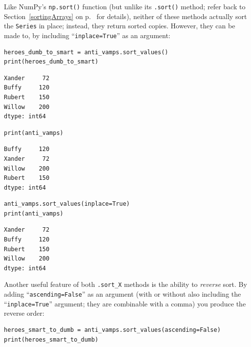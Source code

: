 Like NumPy's \texttt{np.sort()} function (but unlike its \texttt{.sort()}
method; refer back to Section~\ref{sortingArrays} on p.~\pageref{sortingArrays}
for details), neither of these methods actually sort the \texttt{Series} in
place; instead, they return sorted copies. However, they can be made to, by
including ``\texttt{inplace=True}'' as an argument:

\begin{Verbatim}[fontsize=\small,samepage=true,frame=single,framesep=3mm]
heroes_dumb_to_smart = anti_vamps.sort_values()
print(heroes_dumb_to_smart)
\end{Verbatim}
\vspace{-.3in}

\begin{Verbatim}[fontsize=\small,samepage=true,frame=leftline,framesep=5mm,framerule=1mm]
Xander     72
Buffy     120
Rubert    150
Willow    200
dtype: int64
\end{Verbatim}

\begin{Verbatim}[fontsize=\small,samepage=true,frame=single,framesep=3mm]
print(anti_vamps)
\end{Verbatim}
\vspace{-.3in}

\begin{Verbatim}[fontsize=\small,samepage=true,frame=leftline,framesep=5mm,framerule=1mm]
Buffy     120
Xander     72
Willow    200
Rubert    150
dtype: int64
\end{Verbatim}

\begin{Verbatim}[fontsize=\small,samepage=true,frame=single,framesep=3mm]
anti_vamps.sort_values(inplace=True)
print(anti_vamps)
\end{Verbatim}
\vspace{-.3in}

\begin{Verbatim}[fontsize=\small,samepage=true,frame=leftline,framesep=5mm,framerule=1mm]
Xander     72
Buffy     120
Rubert    150
Willow    200
dtype: int64
\end{Verbatim}

Another useful feature of both \texttt{.sort\_X} methods is the ability to
\textit{reverse} sort. By adding ``\texttt{ascending=False}'' as an argument
(with or without also including the ``\texttt{inplace=True}'' argument; they
are combinable with a comma) you produce the reverse order:

\begin{Verbatim}[fontsize=\small,samepage=true,frame=single,framesep=3mm]
heroes_smart_to_dumb = anti_vamps.sort_values(ascending=False)
print(heroes_smart_to_dumb)
\end{Verbatim}
\vspace{-.3in}


